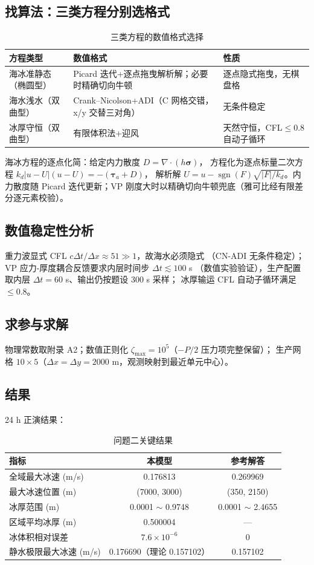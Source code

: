 \documentclass[12pt]{ctexart}
\newcommand{\ts}{\boldsymbol{\tau}}
\newcommand{\sig}{\boldsymbol{\sigma}}
\begin{document}
\subsection{找算法：三类方程分别选格式}
\begin{table}[H]
\centering\caption{三类方程的数值格式选择}
\label{tab:q2schemes}
\begin{tabular}{p{}p{}p{}}
\toprule
方程类型 & 数值格式 & 性质 \\
\midrule
海冰准静态（椭圆型） & Picard 迭代+逐点拖曳解析解；必要时精确切向牛顿 & 逐点隐式拖曳，无棋盘格 \\
海水浅水（双曲型） & Crank--Nicolson+ADI（C 网格交错，x/y 交替三对角） & 无条件稳定 \\
冰厚守恒（双曲型） & 有限体积法+迎风 & 天然守恒，CFL$\le0.8$ 自动子循环 \\
\bottomrule
\end{tabular}
\end{table}

海冰方程的逐点化简：给定内力散度 $D=\nabla\cdot(h\sig)$，
方程化为逐点标量二次方程 $k_d|u-U|(u-U)=-(\ts_a+D)$，
解析解 $U=u-\operatorname{sgn}(F)\sqrt{|F|/k_d}$。内力散度随 Picard
迭代更新；VP 刚度大时以精确切向牛顿兜底（雅可比经有限差分逐元素校验）。

\subsection{数值稳定性分析}
重力波显式 CFL $c\Delta t/\Delta x\approx51\gg1$，故海水必须隐式
（CN-ADI 无条件稳定）；VP 应力-厚度耦合反馈要求内层时间步 $\Delta t\lesssim100$ s
（数值实验验证），生产配置取内层 $\Delta t=60$ s、输出仍按题设 300 s 采样；
冰厚输运 CFL 自动子循环满足 $\le0.8$。

\subsection{求参与求解}
物理常数取附录 A2；数值正则化 $\zeta_{\max}=10^5$（$-P/2$ 压力项完整保留）；
生产网格 $10\times5$（$\Delta x=\Delta y=2000$ m，观测映射到最近单元中心）。

\subsection{结果}
24 h 正演结果：
\begin{table}[H]
\centering\caption{问题二关键结果}
\label{tab:q2res}
\begin{tabular}{lcc}
\toprule
指标 & 本模型 & 参考解答 \\
\midrule
全域最大冰速 (m/s) & 0.176813 & 0.269969 \\
最大冰速位置 (m) & (7000, 3000) & (350, 2150) \\
冰厚范围 (m) & 0.0001 $\sim$ 0.9748 & 0.0001 $\sim$ 2.4655 \\
区域平均冰厚 (m) & 0.500004 & --- \\
冰体积相对误差 & $7.6\times10^{-6}$ & 0 \\
静水极限最大冰速 (m/s) & 0.176690（理论 0.157102） & 0.157102 \\
\bottomrule
\end{tabular}
\end{table}
\end{document}
